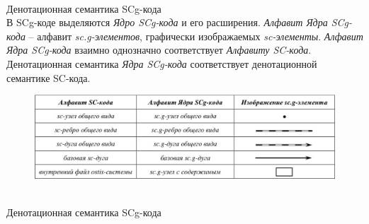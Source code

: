 \begin{frame}{\\Денотационная семантика SCg-кода}
	\topline
	\justifying
	\vspace*{\fill}\\
	В SCg-коде выделяются \textit{Ядро SCg-кода} и его расширения. \textit{Алфавит Ядра SCg-кода} -- алфавит \textit{sc.g-элементов}, графически изображаемых \textit{sc-элементы}. \textit{Алфавит Ядра SCg-кода} взаимно однозначно соответствует \textit{Алфавиту SC-кода}.
	Денотационная семантика \textit{Ядра SCg-кода} соответствует денотационной семантике SC-кода.
	\begin{figure}[H]
		\includegraphics[scale=0.4]{./figures/external_langs/table_scg_code.png}
	\end{figure}
\end{frame}

\begin{frame}{\\Денотационная семантика SCg-кода}
	\topline
	\justifying
	\begin{SCn}
	\end{SCn}
\end{frame}

